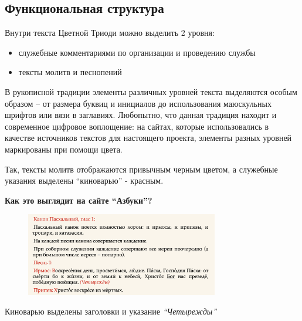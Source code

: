 \documentclass[
  letterpaper,
]{book}
\begin{document}

\hypertarget{sec-func_structure}{%
\subsection{Функциональная структура}\label{sec-func_structure}}

Внутри текста Цветной Триоди можно выделить 2 уровня:

\begin{itemize}
\item
  служебные комментариями по организации и проведению службы
\item
  тексты молитв и песнопений
\end{itemize}

В рукописной традиции элементы различных уровней текста выделяются
особым образом -- от размера буквиц и инициалов до использования
маюскульных шрифтов или вязи в заглавиях. Любопытно, что данная традиция
находит и современное цифровое воплощение: на сайтах, которые
использовались в качестве источников текстов для настоящего проекта,
элементы разных уровней маркированы при помощи цвета.

Так, тексты молитв отображаются привычным черным цветом, а служебные
указания выделены ``киноварью'' - красным.

\begin{tcolorbox}[enhanced jigsaw, rightrule=.15mm, breakable, colframe=quarto-callout-tip-color-frame, colback=white, leftrule=.75mm, left=2mm, arc=.35mm, opacityback=0, toprule=.15mm, bottomrule=.15mm]

\textbf{Как это выглядит на сайте ``Азбуки''?}\vspace{2mm}

\begin{figure}[H]

{\centering \includegraphics[width=0.75\textwidth,height=\textheight]{images/pascha_canon_csl.png}

}

\end{figure}

Киноварью выделены заголовки и указание \emph{``Четырежды''}

\end{tcolorbox}
\end{document}
